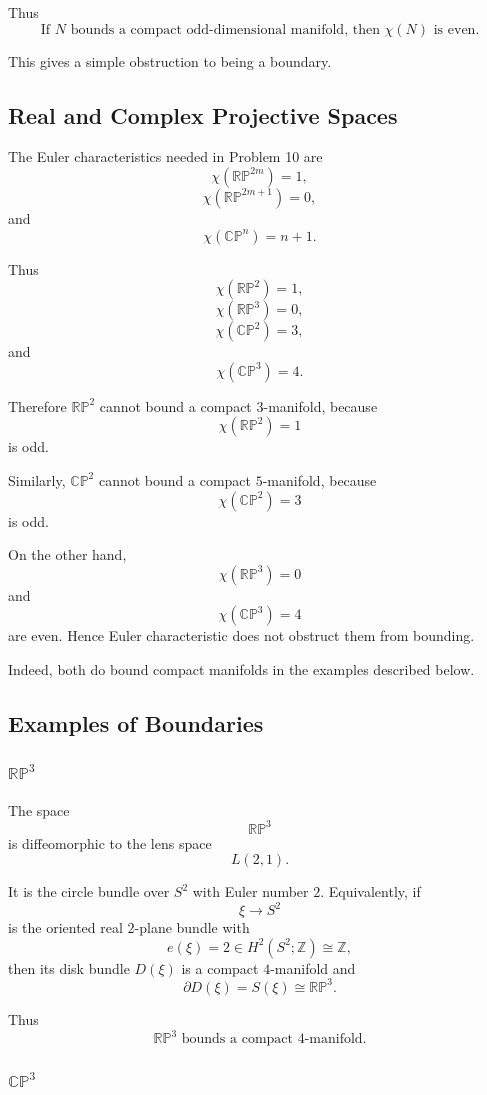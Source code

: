 \documentclass[12pt,a4paper]{article}
\theoremstyle{notespace}
\begin{document}
Thus
\[
\boxed{
	\text{If }N\text{ bounds a compact odd-dimensional manifold, then }\chi(N)
	\text{ is even.}
}
\]

This gives a simple obstruction to being a boundary.

\subsection{Real and Complex Projective Spaces}

The Euler characteristics needed in Problem 10 are
\[
\chi(\mathbb{RP}^{2m})=1,
\]
\[
\chi(\mathbb{RP}^{2m+1})=0,
\]
and
\[
\chi(\mathbb{CP}^{n})=n+1.
\]

Thus
\[
\chi(\mathbb{RP}^{2})=1,
\]
\[
\chi(\mathbb{RP}^{3})=0,
\]
\[
\chi(\mathbb{CP}^{2})=3,
\]
and
\[
\chi(\mathbb{CP}^{3})=4.
\]

Therefore \(\mathbb{RP}^2\) cannot bound a compact \(3\)-manifold, because
\[
\chi(\mathbb{RP}^2)=1
\]
is odd.

Similarly, \(\mathbb{CP}^2\) cannot bound a compact \(5\)-manifold, because
\[
\chi(\mathbb{CP}^2)=3
\]
is odd.

On the other hand,
\[
\chi(\mathbb{RP}^3)=0
\]
and
\[
\chi(\mathbb{CP}^3)=4
\]
are even. Hence Euler characteristic does not obstruct them from bounding.

Indeed, both do bound compact manifolds in the examples described below.

\subsection{Examples of Boundaries}

\subsubsection{\(\mathbb{RP}^3\)}

The space
\[
\mathbb{RP}^3
\]
is diffeomorphic to the lens space
\[
L(2,1).
\]

It is the circle bundle over \(S^2\) with Euler number \(2\). Equivalently, if
\[
\xi\to S^2
\]
is the oriented real \(2\)-plane bundle with
\[
e(\xi)=2\in H^2(S^2;\mathbb Z)\cong \mathbb Z,
\]
then its disk bundle \(D(\xi)\) is a compact \(4\)-manifold and
\[
\partial D(\xi)=S(\xi)\cong \mathbb{RP}^3.
\]

Thus
\[
\boxed{
	\mathbb{RP}^3\text{ bounds a compact }4\text{-manifold.}
}
\]

\subsubsection{\(\mathbb{CP}^3\)}
\end{document}
